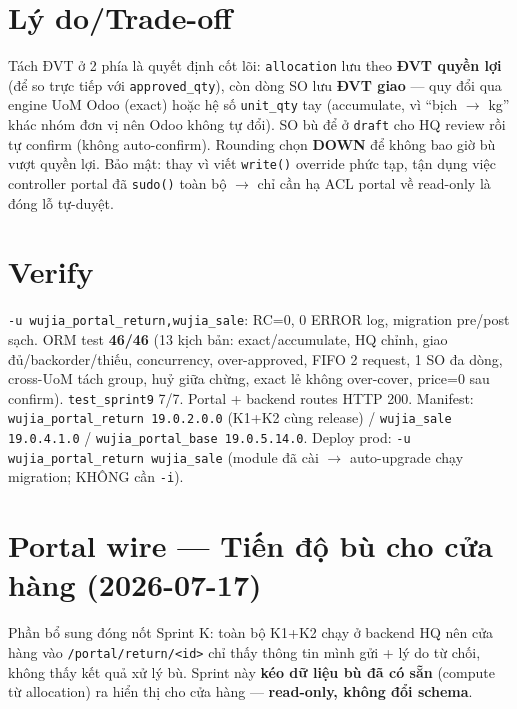 \section{Lý do/Trade-off}

Tách ĐVT ở 2 phía là quyết định cốt lõi: \texttt{allocation} lưu theo \textbf{ĐVT quyền lợi} (để so trực
tiếp với \texttt{approved\_qty}), còn dòng SO lưu \textbf{ĐVT giao} --- quy đổi qua engine UoM Odoo (exact)
hoặc hệ số \texttt{unit\_qty} tay (accumulate, vì ``bịch $\to$ kg'' khác nhóm đơn vị nên Odoo không tự đổi).
SO bù để ở \texttt{draft} cho HQ review rồi tự confirm (không auto-confirm). Rounding chọn \textbf{DOWN} để
không bao giờ bù vượt quyền lợi. Bảo mật: thay vì viết \texttt{write()} override phức tạp, tận dụng việc
controller portal đã \texttt{sudo()} toàn bộ $\to$ chỉ cần hạ ACL portal về read-only là đóng lỗ tự-duyệt.

\section{Verify}

\texttt{-u wujia\_portal\_return,wujia\_sale}: RC=0, 0 ERROR log, migration pre/post sạch. ORM test
\textbf{46/46} (13 kịch bản: exact/accumulate, HQ chỉnh, giao đủ/backorder/thiếu, concurrency, over-approved,
FIFO 2 request, 1 SO đa dòng, cross-UoM tách group, huỷ giữa chừng, exact lẻ không over-cover, price=0
sau confirm). \texttt{test\_sprint9} 7/7. Portal + backend routes HTTP 200. Manifest:
\texttt{wujia\_portal\_return 19.0.2.0.0} (K1+K2 cùng release) / \texttt{wujia\_sale 19.0.4.1.0} /
\texttt{wujia\_portal\_base 19.0.5.14.0}. Deploy prod: \texttt{-u wujia\_portal\_return wujia\_sale}
(module đã cài $\to$ auto-upgrade chạy migration; KHÔNG cần \texttt{-i}).

\section{Portal wire --- Tiến độ bù cho cửa hàng (2026-07-17)}

Phần bổ sung đóng nốt Sprint K: toàn bộ K1+K2 chạy ở backend HQ nên cửa hàng vào
\texttt{/portal/return/<id>} chỉ thấy thông tin mình gửi + lý do từ chối, không thấy kết quả xử lý bù.
Sprint này \textbf{kéo dữ liệu bù đã có sẵn} (compute từ allocation) ra hiển thị cho cửa hàng ---
\textbf{read-only, không đổi schema}.

